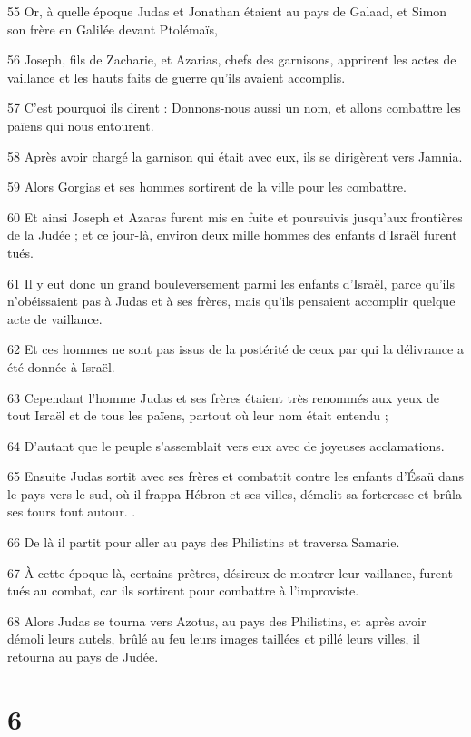 \par 55 Or, à quelle époque Judas et Jonathan étaient au pays de Galaad, et Simon son frère en Galilée devant Ptolémaïs,
\par 56 Joseph, fils de Zacharie, et Azarias, chefs des garnisons, apprirent les actes de vaillance et les hauts faits de guerre qu'ils avaient accomplis.
\par 57 C'est pourquoi ils dirent : Donnons-nous aussi un nom, et allons combattre les païens qui nous entourent.
\par 58 Après avoir chargé la garnison qui était avec eux, ils se dirigèrent vers Jamnia.
\par 59 Alors Gorgias et ses hommes sortirent de la ville pour les combattre.
\par 60 Et ainsi Joseph et Azaras furent mis en fuite et poursuivis jusqu'aux frontières de la Judée ; et ce jour-là, environ deux mille hommes des enfants d'Israël furent tués.
\par 61 Il y eut donc un grand bouleversement parmi les enfants d'Israël, parce qu'ils n'obéissaient pas à Judas et à ses frères, mais qu'ils pensaient accomplir quelque acte de vaillance.
\par 62 Et ces hommes ne sont pas issus de la postérité de ceux par qui la délivrance a été donnée à Israël.
\par 63 Cependant l'homme Judas et ses frères étaient très renommés aux yeux de tout Israël et de tous les païens, partout où leur nom était entendu ;
\par 64 D'autant que le peuple s'assemblait vers eux avec de joyeuses acclamations.
\par 65 Ensuite Judas sortit avec ses frères et combattit contre les enfants d'Ésaü dans le pays vers le sud, où il frappa Hébron et ses villes, démolit sa forteresse et brûla ses tours tout autour. .
\par 66 De là il partit pour aller au pays des Philistins et traversa Samarie.
\par 67 À cette époque-là, certains prêtres, désireux de montrer leur vaillance, furent tués au combat, car ils sortirent pour combattre à l'improviste.
\par 68 Alors Judas se tourna vers Azotus, au pays des Philistins, et après avoir démoli leurs autels, brûlé au feu leurs images taillées et pillé leurs villes, il retourna au pays de Judée.

\chapter{6}

